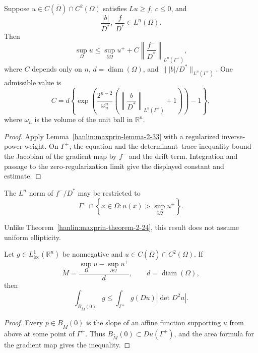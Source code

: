 \begin{theorem}\label{hanlin:maxprin-theorem-2-30}
Suppose $u\in C(\overline\Omega)\cap C^2(\Omega)$ satisfies $Lu\ge f$, $c\le0$,
and
\[
\frac{|b|}{D^*},\ \frac f{D^*}\in L^n(\Omega).
\]
Then
\[
\sup_\Omega u\le\sup_{\partial\Omega}u^+
+C\left\|\frac{f^-}{D^*}\right\|_{L^n(\Gamma^+)},
\]
where $C$ depends only on $n$, $d=\operatorname{diam}(\Omega)$, and
$\||b|/D^*\|_{L^n(\Gamma^+)}$. One admissible value is
\[
C=d\left\{\exp\!\left(
\frac{2^{n-2}}{\omega_n^n}
\left(\left\|\frac b{D^*}\right\|_{L^n(\Gamma^+)}+1\right)
\right)-1\right\},
\]
where $\omega_n$ is the volume of the unit ball in $\mathbb R^n$.
\end{theorem}
\begin{proof}
\sketch Apply Lemma~\ref{hanlin:maxprin-lemma-2-33} with a regularized
inverse-power weight. On $\Gamma^+$, the equation and the determinant--trace
inequality bound the Jacobian of the gradient map by $f^-$ and the drift term.
Integration and passage to the zero-regularization limit give the displayed
constant and estimate.
\end{proof}

\begin{remark}\label{hanlin:maxprin-remark-2-31}
The $L^n$ norm of $f^-/D^*$ may be restricted to
\[
\Gamma^+\cap\left\{x\in\Omega:
u(x)>\sup_{\partial\Omega}u^+\right\}.
\]
\end{remark}

\begin{remark}\label{hanlin:maxprin-remark-2-32}
Unlike Theorem~\ref{hanlin:maxprin-theorem-2-24}, this result does not assume
uniform ellipticity.
\end{remark}

\begin{lemma}\label{hanlin:maxprin-lemma-2-33}


Let $g\in L^1_{\mathrm{loc}}(\mathbb R^n)$ be nonnegative and
$u\in C(\overline\Omega)\cap C^2(\Omega)$. If
\[
\widetilde M=\frac{\sup_\Omega u-\sup_{\partial\Omega}u^+}
{d},
\qquad d=\operatorname{diam}(\Omega),
\]
then
\[
\int_{B_{\widetilde M}(0)}g
\le\int_{\Gamma^+}g(Du)|\det D^2u|.
\]
\end{lemma}
\begin{proof}
\sketch Every $p\in B_{\widetilde M}(0)$ is the slope of an affine function
supporting $u$ from above at some point of $\Gamma^+$. Thus
$B_{\widetilde M}(0)\subset Du(\Gamma^+)$, and the area formula for the gradient
map gives the inequality.
\end{proof}


